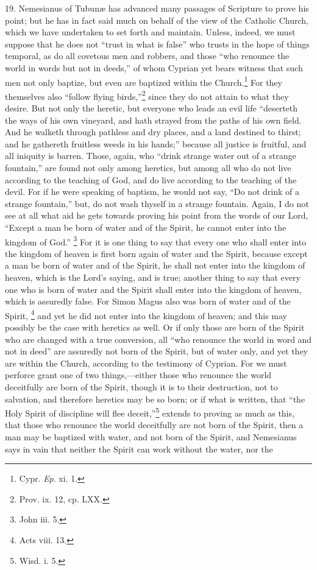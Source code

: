 19. Nemesianus of Tubunæ has advanced many passages of Scripture to prove his point; but he has in fact said much on behalf of the view of the Catholic Church, which we have undertaken to set forth and maintain. Unless, indeed, we must suppose that he does not ``trust in what is false'' who trusts in the hope of things temporal, as do all covetous men and robbers, and those ``who renounce the world in words but not in deeds,'' of whom Cyprian yet bears witness that such men not only baptize, but even are baptized within the Church.\footnote{\par  Cypr. \emph{Ep}. xi. 1.} For they themselves also ``follow flying birds,''\footnote{\par  Prov. ix. 12, cp. LXX.} since they do not attain to what they desire. But not only the heretic, but everyone who leads an evil life ``deserteth the ways of his own vineyard, and hath strayed from the paths of his own field. And he walketh through pathless and dry places, and a land destined to thirst; and he gathereth fruitless weeds in his hands;'' because all justice is fruitful, and all iniquity is barren. Those, again, who ``drink strange water out of a strange fountain,'' are found not only among heretics, but among all who do not live according to the teaching of God, and do live according to the teaching of the devil. For if he were speaking of baptism, he would not say, ``Do not drink of a strange fountain,'' but, do not wash thyself in a strange fountain. Again, I do not see at all what aid he gets towards proving his point from the words of our Lord, ``Except a man be born of water and of the Spirit, he cannot enter into the kingdom of God.'' \footnote{\par  John iii. 5.} For it is one thing to say that every one who shall enter into the kingdom of heaven is first born again of water and the Spirit, because except a man be born of water and of the Spirit, he shall not enter into the kingdom of heaven, which is the Lord’s saying, and is true; another thing to say that every one who is born of water and the Spirit shall enter into the kingdom of heaven, which is assuredly false. For Simon Magus also was born of water and of the Spirit, \footnote{\par  Acts viii. 13.} and yet he did not enter into the kingdom of heaven; and this may possibly be the case with heretics as well. Or if only those are born of the Spirit who are changed with a true conversion, all ``who renounce the world in word and not in deed'' are assuredly not born of the Spirit, but of water only, and yet they are within the Church, according to the testimony of Cyprian. For we must perforce grant one of two things,—either those who renounce the world deceitfully are born of the Spirit, though it is to their destruction, not to salvation, and therefore heretics may be so born; or if what is written, that ``the Holy Spirit of discipline will flee deceit,''\footnote{\par  Wisd. i. 5.} extends to proving as much as this, that those who renounce the world deceitfully are not born of the Spirit, then a man may be baptized with water, and not born of the Spirit, and Nemesianus says in vain that neither the Spirit can work without the water, nor the 